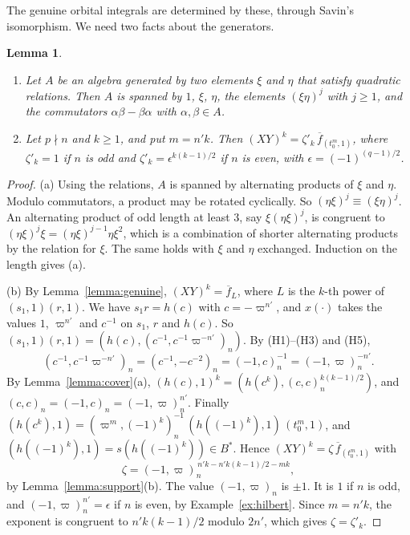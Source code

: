 \documentclass[12pt,letterpaper]{amsart}
\numberwithin{equation}{section}
\newtheorem{lemma}[theorem]{Lemma}
\theoremstyle{definition}
\theoremstyle{remark}
\newcommand{\fbar}{\overline{f}}
\begin{document}
The genuine orbital integrals are determined by these, through Savin's
isomorphism. We need two facts about the generators.

\begin{lemma}
\label{lemma:cocenter}
\begin{enumerate}[leftmargin=2em,label=(\alph*)]
\item Let $A$ be an algebra generated by two elements $\xi$ and $\eta$
that satisfy quadratic relations. Then $A$ is spanned by $1$, $\xi$,
$\eta$, the elements $(\xi\eta)^j$ with $j\geq1$, and the commutators
$\alpha\beta-\beta\alpha$ with $\alpha,\beta\in A$.
\item Let $p\nmid n$ and $k\geq1$, and put $m=n'k$. Then
$(XY)^k=\zeta'_k\,\fbar_{(t_0^m,1)}$, where $\zeta'_k=1$ if $n$ is odd
and $\zeta'_k=\epsilon^{k(k-1)/2}$ if $n$ is even, with
$\epsilon=(-1)^{(q-1)/2}$.
\end{enumerate}
\end{lemma}

\begin{proof}
(a) Using the relations, $A$ is spanned by alternating products of
$\xi$ and $\eta$. Modulo commutators, a product may be rotated
cyclically. So $(\eta\xi)^j\equiv(\xi\eta)^j$. An alternating product
of odd length at least $3$, say $\xi(\eta\xi)^j$, is congruent to
$(\eta\xi)^j\xi=(\eta\xi)^{j-1}\eta\xi^2$, which is a combination of
shorter alternating products by the relation for $\xi$. The same holds
with $\xi$ and $\eta$ exchanged. Induction on the length gives (a).

(b) By Lemma~\ref{lemma:genuine}, $(XY)^k=\fbar_L$, where $L$ is the
$k$-th power of $(s_1,1)(r,1)$. We have $s_1r=h(c)$ with
$c=-\varpi^{n'}$, and $x(\cdot)$ takes the values $1$, $\varpi^{n'}$
and $c^{-1}$ on $s_1$, $r$ and $h(c)$. So
$(s_1,1)(r,1)=(h(c),(c^{-1},c^{-1}\varpi^{-n'})_n)$. By (H1)--(H3) and
(H5),
\[
(c^{-1},c^{-1}\varpi^{-n'})_n=(c^{-1},-c^{-2})_n=(-1,c)_n^{-1}
=(-1,\varpi)_n^{-n'} .
\] By Lemma~\ref{lemma:cover}(a),
$(h(c),1)^k=(h(c^k),(c,c)_n^{k(k-1)/2})$, and
$(c,c)_n=(-1,c)_n=(-1,\varpi)_n^{n'}$. Finally
$(h(c^k),1)=(\varpi^m,(-1)^k)_n^{-1}\,(h((-1)^k),1)\,(t_0^m,1)$, and
$(h((-1)^k),1)=s(h((-1)^k))\in B^*$. Hence $(XY)^k=\zeta\,
\fbar_{(t_0^m,1)}$ with
\[
\zeta=(-1,\varpi)_n^{\,n'k-n'k(k-1)/2-mk},
\]
by Lemma~\ref{lemma:support}(b). The value $(-1,\varpi)_n$ is $\pm1$.
It is $1$ if $n$ is odd, and $(-1,\varpi)_n^{n'}=\epsilon$ if $n$ is
even, by Example~\ref{ex:hilbert}. Since $m=n'k$, the exponent is
congruent to $n'k(k-1)/2$ modulo $2n'$, which gives $\zeta=\zeta'_k$.
\end{proof}
\end{document}
